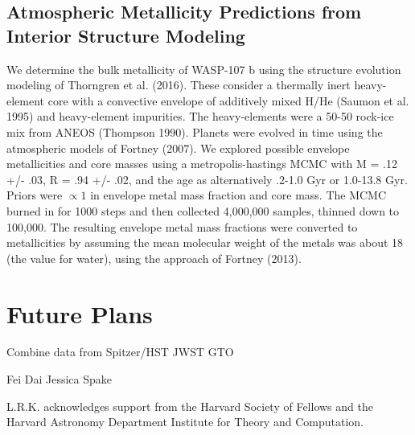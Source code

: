 \documentclass[twocolumn]{aastex61}
\begin{document}
\subsection{Atmospheric Metallicity Predictions from Interior Structure Modeling}
 We determine the bulk metallicity of WASP-107 b using the structure evolution modeling of Thorngren et al. (2016).  These consider a thermally inert heavy-element core with a convective envelope of additively mixed H/He (Saumon et al. 1995) and heavy-element impurities.  The heavy-elements were a 50-50 rock-ice mix from ANEOS (Thompson 1990).  Planets were evolved in time using the atmospheric models of Fortney (2007).  We explored possible envelope metallicities and core masses using a metropolis-hastings MCMC with M = .12 +/- .03, R = .94 +/- .02, and the age as alternatively .2-1.0 Gyr or 1.0-13.8 Gyr.  Priors were $\propto 1$ in envelope metal mass fraction and core mass.  The MCMC burned in for 1000 steps and then collected 4,000,000 samples, thinned down to 100,000.  The resulting envelope metal mass fractions were converted to metallicities by assuming the mean molecular weight of the metals was about 18 (the value for water), using the approach of Fortney (2013).


\section{Future Plans}
Combine data from Spitzer/HST
JWST GTO


\acknowledgments
Fei Dai
Jessica Spake

L.R.K. acknowledges support from the Harvard Society of Fellows and the Harvard Astronomy Department Institute for Theory and Computation.

\vspace{5mm}



\end{document}
